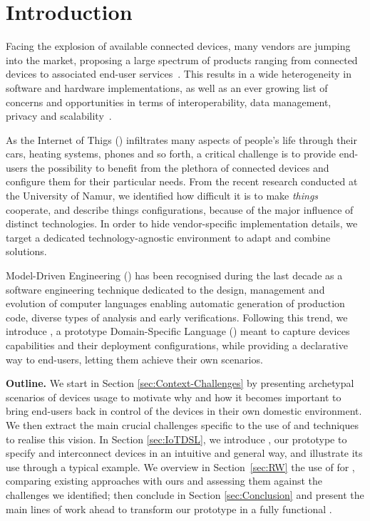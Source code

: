 \section{Introduction}
\label{sec:Introduction}

Facing the explosion of available connected devices, many vendors are jumping into the market, proposing a large spectrum of products ranging from connected devices to associated end-user services~\cite{lee-15}. This results in a wide heterogeneity in software and hardware implementations, as well as an ever growing list of concerns and opportunities in terms of interoperability, data management, privacy and scalability~\cite{chaqfeh-12}.

As the Internet of Thigs (\IOT) infiltrates many aspects of people's life through their cars, heating systems, phones and so forth, a critical challenge is to provide end-users the possibility to benefit from the plethora of connected devices and configure them for their particular needs. From the recent research conducted at the University of Namur, we identified how difficult it is to make \textit{things} cooperate, and describe things configurations, because of the major influence of distinct technologies. In order to hide vendor-specific implementation details, we target a dedicated technology-agnostic environment to adapt and combine \IOT solutions.

Model-Driven Engineering (\MDE) has been recognised during the last decade as a software engineering technique dedicated to the design, management and evolution of computer languages enabling automatic generation of production code, diverse types of analysis and early verifications. Following this trend, we introduce \IOTDSL, a prototype Domain-Specific Language (\DSL) meant to capture \IOT devices capabilities and their deployment configurations, while providing a declarative way to end-users, letting them achieve their own scenarios.

\noindent
\textbf{Outline.} We start in Section \ref{sec:Context-Challenges} by presenting archetypal scenarios of \IOT devices usage to motivate why and how it becomes important to bring end-users back in control of the devices in their own domestic environment. We then extract the main crucial \IOT challenges specific to the use of \DSLS and \MDE techniques to realise this vision. In Section \ref{sec:IoTDSL}, we introduce \IOTDSL, our prototype \DSL to specify and interconnect devices in an intuitive and general way, and illustrate its use through a typical example. We overview in Section~\ref{sec:RW} the use of \DSLS for \IOT, comparing existing approaches with ours and assessing them against the challenges we identified; then conclude in Section \ref{sec:Conclusion} and present the main lines of work ahead to transform our prototype in a fully functional \DSL.
